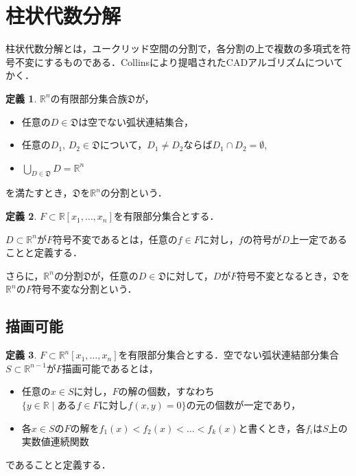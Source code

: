 \documentclass[uplatex, dvipdfmx]{jsarticle}
\newcommand{\R}{\mathbb{R}}
\theoremstyle{definition}
\newtheorem{definition}{定義}[section]
\begin{document}
\section{柱状代数分解}
柱状代数分解とは，ユークリッド空間の分割で，各分割の上で複数の多項式を符号不変にするものである．Collinsにより提唱されたCADアルゴリズムについてかく．
\begin{definition}
$\R^n$の有限部分集合族$\mathfrak{D}$が，

\begin{itemize}
	\item 任意の$D \in \mathfrak{D}$は空でない弧状連結集合，
	\item 任意の$D_1$, $D_2 \in \mathfrak{D}$について，$D_1 \neq D_2$ならば$D_1 \cap D_2 = \emptyset$,
	\item $\bigcup_{D \in \mathfrak{D}}D = \R^n$
\end{itemize}

を満たすとき，$\mathfrak{D}$を$\R^n$の分割という．
\end{definition}

\begin{definition}
$F \subset \R[x_1, \dots, x_n]$を有限部分集合とする．

$D \subset \R^n$が$F$符号不変であるとは，任意の$f \in F$に対し，$f$の符号が$D$上一定であることと定義する．

さらに，$\R^n$の分割$\mathfrak{D}$が，任意の$D \in \mathfrak{D}$に対して，$D$が$F$符号不変となるとき，$\mathfrak{D}$を$\R^n$の$F$符号不変な分割という．
\end{definition}

\subsection{描画可能}
\begin{definition}
$F \subset \R^n[x_1, \dots, x_n]$を有限部分集合とする．空でない弧状連結部分集合$S \subset \R^{n-1}$が$F$描画可能であるとは，
\begin{itemize}
	\item 任意の$ x \in S $に対し，$ F $の解の個数，すなわち$ \{y \in \mathbb{R} \mid \text{ある$f \in F$に対し$f(x,y) = 0$} \} $の元の個数が一定であり，
	\item 各$ x \in S $の$F$の解を$ f_1(x) < f_2(x) < \dots < f_k(x) $と書くとき，各$ f_i $は$ S $上の実数値連続関数
\end{itemize}
であることと定義する．
\end{definition}
\end{document}
